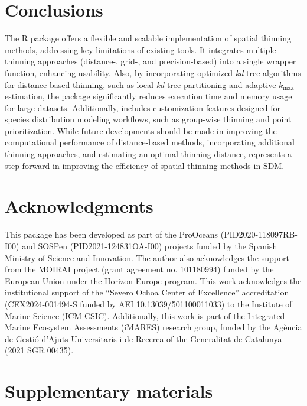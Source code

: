 \section{Conclusions}\label{conclusions}

The  R package offers a flexible and scalable implementation of spatial thinning methods, addressing key limitations of existing tools. It integrates multiple thinning approaches (distance-, grid-, and precision-based) into a single wrapper function, enhancing usability. Also, by incorporating optimized \emph{kd}-tree algorithms for distance-based thinning, such as local \emph{kd}-tree partitioning and adaptive \(k_\text{max}\) estimation, the package significantly reduces execution time and memory usage for large datasets. Additionally,  includes customization features designed for species distribution modeling workflows, such as group-wise thinning and point prioritization. While future developments should be made in improving the computational performance of distance-based methods, incorporating additional thinning approaches, and estimating an optimal thinning distance,  represents a step forward in improving the efficiency of spatial thinning methods in SDM.

\section{Acknowledgments}\label{acknowledgments}

This package has been developed as part of the ProOceans (PID2020-118097RB-I00) and SOSPen (PID2021-124831OA-I00) projects funded by the Spanish Ministry of Science and Innovation. The author also acknowledges the support from the MOIRAI project (grant agreement no. 101180994) funded by the European Union under the Horizon Europe program. This work acknowledges the institutional support of the ``Severo Ochoa Center of Excellence'' accreditation (CEX2024-001494-S funded by AEI 10.13039/501100011033) to the Institute of Marine Science (ICM-CSIC). Additionally, this work is part of the Integrated Marine Ecosystem Assessments (iMARES) research group, funded by the Agència de Gestió d'Ajuts Universitaris i de Recerca of the Generalitat de Catalunya (2021 SGR 00435).

\section{Supplementary materials}\label{supplementary-materials}

